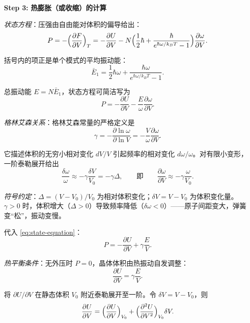 \begin{derivationbox}[标准解题过程]
\textbf{Step 3: 热膨胀（或收缩）的计算}

\textit{状态方程}：压强由自由能对体积的偏导给出：
\begin{equation}
P=-\Bigl(\frac{\partial F}{\partial V}\Bigr)_T
=-\frac{\partial U}{\partial V}-N\Bigl(\frac{1}{2}\hbar+\frac{\hbar}{e^{\hbar\omega/k_BT}-1}\Bigr)\frac{\partial\omega}{\partial V}.
\end{equation}

括号内的项正是单个模式的平均振动能：
\begin{equation}
\bar{E}_1=\frac{1}{2}\hbar\omega+\frac{\hbar\omega}{e^{\hbar\omega/k_BT}-1}.
\end{equation}

总振动能 $E=N\bar{E}_1$，状态方程可简洁写为
\begin{equation}
P=-\frac{\partial U}{\partial V}-\frac{E}{\omega}\frac{\partial\omega}{\partial V}.
\label{eq:state-equation}
\end{equation}

\textit{格林艾森关系}：格林艾森常量的严格定义是
\begin{equation}
\gamma=-\frac{\partial\ln\omega}{\partial\ln V}=-\frac{V}{\omega}\frac{\partial\omega}{\partial V}.
\label{eq:gruneisen-relation}
\end{equation}

它描述体积的无穷小相对变化 $dV/V$ 引起频率的相对变化 $d\omega/\omega$。对有限小变形，一阶泰勒展开给出
\begin{equation}
\frac{\delta\omega}{\omega}\approx-\gamma\frac{\delta V}{V_0}=-\gamma\Delta,
\qquad\text{即}\qquad
\frac{\partial\omega}{\partial V}\approx-\gamma\frac{\omega}{V_0}.
\end{equation}

\textit{符号约定}：$\Delta=(V-V_0)/V_0$ 为相对体积变化；$\delta V=V-V_0$ 为体积变化量。$\gamma>0$ 时，体积增大（$\Delta>0$）导致频率降低（$\delta\omega<0$）——原子间距变大，弹簧变``松''，振动变慢。

代入 \eqref{eq:state-equation}：
\begin{equation}
P=-\frac{\partial U}{\partial V}+\gamma\frac{E}{V}.
\end{equation}

\textit{热平衡条件}：无外压时 $P=0$，晶体体积由热振动自发调整：
\begin{equation}
\frac{\partial U}{\partial V}=\gamma\frac{E}{V}.
\end{equation}

将 $\partial U/\partial V$ 在静态体积 $V_0$ 附近泰勒展开至一阶。令 $\delta V=V-V_0$，则
\begin{equation}
\frac{\partial U}{\partial V}=\Bigl(\frac{\partial U}{\partial V}\Bigr)_{V_0}+\Bigl(\frac{\partial^2U}{\partial V^2}\Bigr)_{V_0}\delta V.
\end{equation}


\end{derivationbox}
